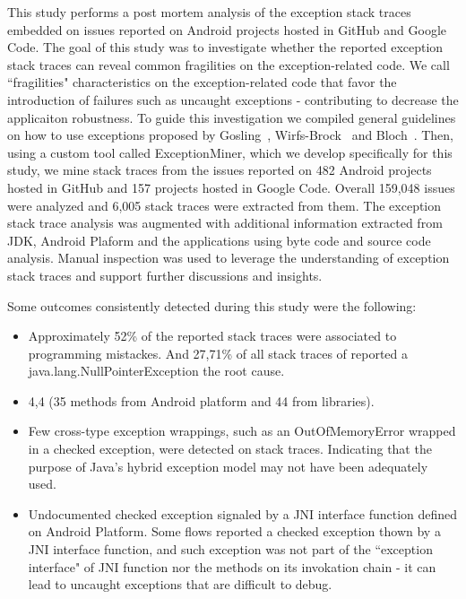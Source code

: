 \documentclass[conference]{IEEEtran}
\begin{document}
This study performs a post mortem analysis of the exception stack traces embedded on issues
reported on Android projects hosted in GitHub and Google Code. 
The goal of this study was to investigate whether the reported exception stack traces
 can reveal common fragilities on the exception-related code.  
We call ``fragilities" characteristics on the exception-related code 
that favor the introduction of failures such as uncaught 
exceptions -  contributing to decrease the applicaiton robustness.
To guide this investigation we compiled general guidelines on how to use
exceptions proposed by Gosling~\cite{gosling2000java},
Wirfs-Brock~\cite{wirfs2006toward} and Bloch~\cite{bloch2008effective}.
Then, using a custom tool called ExceptionMiner,
 which we develop specifically for this study, we mine stack traces from the issues reported 
on 482 Android projects hosted in GitHub and 157 projects hosted in Google Code.
Overall 159,048 issues were analyzed and 6,005 stack traces were extracted from them.
The exception stack trace analysis was augmented with additional information
extracted from JDK, Android Plaform and the applications using byte code 
and source code analysis. Manual inspection was used to leverage the understanding 
of exception stack traces and support further discussions and insights.

Some outcomes consistently detected during this study were the following:

\begin{itemize}

       \item Approximately 52\% of the reported stack traces were associated to programming mistackes. 
And 27,71\% of all stack traces of reported a java.lang.NullPointerException the root cause.

       \item  4,4%
             (35 methods from Android platform and 44 from libraries). 

     \item  Few cross-type exception wrappings, such as an OutOfMemoryError wrapped in a checked exception,
were detected on stack traces. Indicating that the purpose of Java's hybrid exception model may not have been adequately used.

   

   \item Undocumented checked exception signaled by a  JNI interface function defined on Android Platform. 
    Some flows reported a checked exception thown by a JNI interface function, and  such exception was not  
    part of the ``exception interface" of JNI function nor the methods on its invokation chain - it can lead to 
   uncaught exceptions that are difficult to debug. 

\end{itemize}
\end{document}
